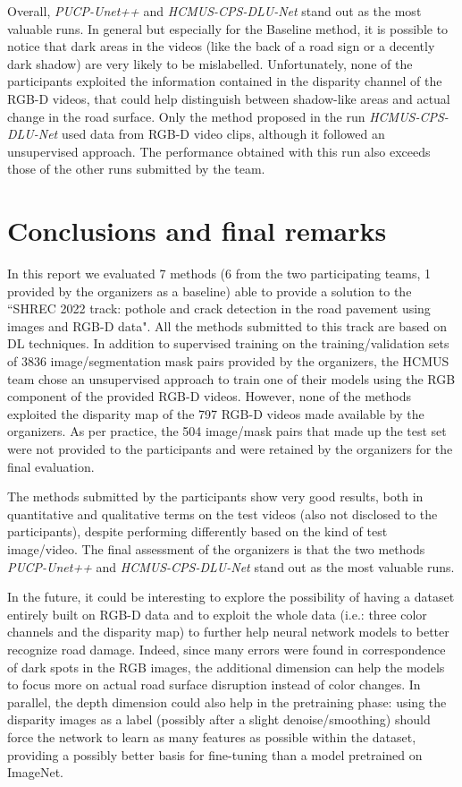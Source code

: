 \documentclass[twocolumn]{article}
\newcommand{\PUCP}[0]{PUCP}\newcommand{\HCMUS}[0]{HCMUS}\newcommand{\baseline}[0]{Baseline}
\begin{document}
Overall, \emph{\PUCP{}-Unet++} and \emph{\HCMUS{}-CPS-DLU-Net} stand out as the most valuable runs. In general but especially for the \baseline{} method, it is possible to notice that dark areas in the videos (like the back of a road sign or a decently dark shadow) are very likely to be mislabelled. Unfortunately, none of the participants exploited the information contained in the disparity channel of the RGB-D videos, that could help distinguish between shadow-like areas and actual change in the road surface. Only the method proposed in the run \emph{\HCMUS{}-CPS-DLU-Net} used data from RGB-D video clips, although it followed an unsupervised approach. The performance obtained with this run also exceeds those of the other runs submitted by the team.
\section{Conclusions and final remarks}
\label{sec:conclusions}

In this report we evaluated 7 methods (6 from the two participating teams, 1 provided by the organizers as a baseline) able to provide a solution to the ``SHREC 2022 track: pothole and crack detection in the road pavement using images and RGB-D data". All the methods submitted to this track are based on DL techniques.
In addition to supervised training on the training/validation sets of 3836 image/segmentation mask pairs provided by the organizers, the \HCMUS{} team chose an unsupervised approach to train one of their models using the RGB component of the provided RGB-D videos. However, none of the methods exploited the disparity map of the 797 RGB-D videos made available by the organizers. As per practice, the 504 image/mask pairs that made up the test set were not provided to the participants and were retained by the organizers for the final evaluation.

The methods submitted by the participants show very good results, both in quantitative and qualitative terms on the test videos (also not disclosed to the participants), despite performing differently based on the kind of test image/video. The final assessment of the organizers is that the two methods \emph{\PUCP{}-Unet++} and \emph{\HCMUS{}-CPS-DLU-Net} stand out as the most valuable runs.

In the future, it could be interesting to explore the possibility of having a dataset entirely built on RGB-D data and to exploit the whole data (i.e.: three color channels and the disparity map) to further help neural network models to better recognize road damage. Indeed, since many errors were found in correspondence of dark spots in the RGB images, the additional dimension can help the models to focus more on actual road surface disruption instead of color changes.
In parallel, the depth dimension could also help in the pretraining phase: using the disparity images as a label (possibly after a slight denoise/smoothing) should force the network to learn as many features as possible within the dataset, providing a possibly better basis for fine-tuning than a model pretrained on ImageNet.
\end{document}
